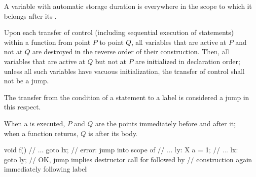 \pnum
{}%
%
%
A variable with automatic storage duration
is  everywhere in the scope to which it belongs
after its .

\pnum
{}%
%
Upon each transfer of control (including sequential execution of statements)
within a function from point $P$ to point $Q$,
all variables that are active at $P$ and not at $Q$ are destroyed in the reverse order of their construction.
Then, all variables that are active at $Q$ but not at $P$ are initialized in declaration order;
unless all such variables have vacuous initialization,
the transfer of control shall not be a jump.
\begin{footnote}
The transfer from the condition of a  statement to a
 label is considered a jump in this respect.
\end{footnote}
When a  is executed,
$P$ and $Q$ are the points immediately before and after it;
when a function returns, $Q$ is after its body.
\begin{example}
\begin{codeblock}
void f() {
  // ...
  goto lx;          // error: jump into scope of 
  // ...
ly:
  X a = 1;
  // ...
lx:
  goto ly;          // OK, jump implies destructor call for  followed by
                    // construction again immediately following label 
}
\end{codeblock}
\end{example}

